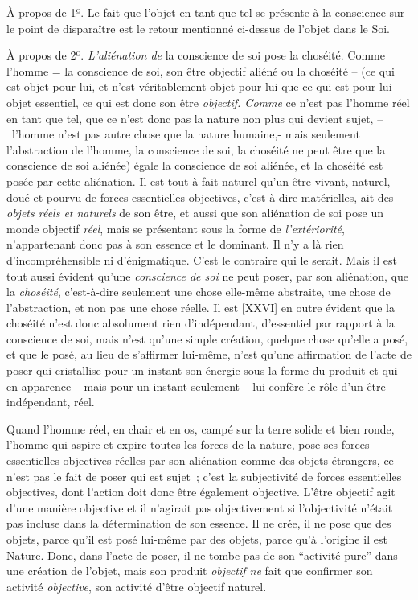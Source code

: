 \documentclass[french,twoside]{book} %
\begin{document}
À propos de 1º. Le fait que l’objet en tant que tel se présente à la conscience sur le point de disparaître est le retour mentionné ci-dessus de l’objet dans le Soi.\par
À propos de 2º. \emph{L’aliénation de} la conscience de soi pose la choséité. Comme l’homme = la conscience de soi, son être objectif aliéné ou la choséité – (ce qui est objet pour lui, et n’est véritablement objet pour lui que ce qui est pour lui objet essentiel, ce qui est donc son être \emph{objectif. Comme} ce n’est pas l’homme réel en tant que tel, que ce n’est donc pas la nature non plus qui devient sujet, – l’homme n’est pas autre chose que la nature humaine,- mais seulement l’abstraction de l’homme, la conscience de soi, la choséité ne peut être que la conscience de soi aliénée) égale la conscience de soi aliénée, et la choséité est posée par cette aliénation. Il est tout à fait naturel qu’un être vivant, naturel, doué et pourvu de forces essentielles objectives, c’est-à-dire matérielles, ait des \emph{objets réels et naturels} de son être, et aussi que son aliénation de soi pose un monde objectif \emph{réel}, mais se présentant sous la forme de \emph{l’extériorité}, n’appartenant donc pas à son essence et le dominant. Il n’y a là rien d’incompréhensible ni d’énigmatique. C’est le contraire qui le serait. Mais il est tout aussi évident qu’une \emph{conscience de soi} ne peut poser, par son aliénation, que la \emph{choséité}, c’est-à-dire seulement une chose elle-même abstraite, une chose de l’abstraction, et non pas une chose réelle. Il est [XXVI] en outre évident que la choséité n’est donc absolument rien d’indépendant, d’essentiel par rapport à la conscience de soi, mais n’est qu’une simple création, quelque chose qu’elle a posé, et que le posé, au lieu de s’affirmer lui-même, n’est qu’une affirmation de l’acte de poser qui cristallise pour un instant son énergie sous la forme du produit et qui en apparence – mais pour un instant seulement – lui confère le rôle d’un être indépendant, réel.\par
Quand l’homme réel, en chair et en os, campé sur la terre solide et bien ronde, l’homme qui aspire et expire toutes les forces de la nature, pose ses forces essentielles objectives réelles par son aliénation comme des objets étrangers, ce n’est pas le fait de poser qui est sujet ; c’est la subjectivité de forces essentielles objectives, dont l’action doit donc être également objective. L’être objectif agit d’une manière objective et il n’agirait pas objectivement si l’objectivité n’était pas incluse dans la détermination de son essence. Il ne crée, il ne pose que des objets, parce qu’il est posé lui-même par des objets, parce qu’à l’origine il est Nature. Donc, dans l’acte de poser, il ne tombe pas de son “activité pure” dans une création de l’objet, mais son produit \emph{objectif ne} fait que confirmer son activité \emph{objective}, son activité d’être objectif naturel.\par
\end{document}

